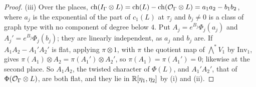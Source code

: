 \begin{proof}
(iii) Over the places, $\operatorname{ch}(I_{\Gamma}\otimes L)=\operatorname{ch}(L)-\operatorname{ch}(\mathcal{O}_{\Gamma}\otimes
L)=a_{1}a_{2}-b_{1}b_{2}$, where $a_{j}$ is the exponential of the part of
$c_{1}(L)$ at $\tau_{j}$ and $b_{j}\ne0$ is a class of graph type with no
component of degree below $4$. Put $A_{j}=e^{B_{j}}\Phi_{j}(a_{j})$ and
$A_{j}'=e^{B_{j}}\Phi_{j}(b_{j})$; they are linearly independent, as $a_{j}$
and $b_{j}$ are. If $A_{1}A_{2}-A_{1}'A_{2}'$ is flat, applying $\pi\otimes1$,
with $\pi$ the quotient map of $\bigwedge^{*}V_{1}$ by $\mathrm{Inv}_{1}$,
gives $\pi(A_{1})\otimes A_{2}=\pi(A_{1}')\otimes A_{2}'$, so
$\pi(A_{1})=\pi(A_{1}')=0$; likewise at the second place. So $A_{1}A_{2}$, the
twisted character of $\Phi(L)$, and $A_{1}'A_{2}'$, that of
$\Phi(\mathcal{O}_{\Gamma}\otimes L)$, are both flat, and they lie in
$\mathbb{R}[\eta_{1},\eta_{2}]$ by (i) and (ii).
\end{proof}

